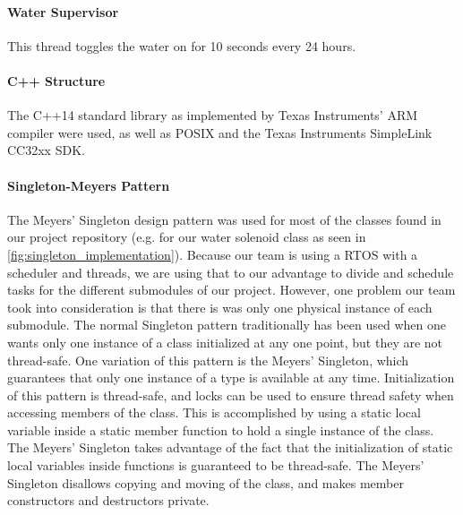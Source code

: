 \paragraph{Water Supervisor} This thread toggles the water on for 10 seconds every 24 hours.

\paragraph{C++ Structure}
The C++14 standard library as implemented by Texas Instruments' ARM compiler were used, as well as POSIX and the Texas Instruments SimpleLink CC32xx SDK.

\paragraph{Singleton-Meyers Pattern}
The Meyers' Singleton design pattern was used for most of the classes found in our project repository (e.g. for our water solenoid class as seen in \ref{fig:singleton_implementation}). Because our team is using a RTOS with a scheduler and threads, we are using that to our advantage to divide and schedule tasks for the different submodules of our project. However, one problem our team took into consideration is that there is was only one physical instance of each submodule. The normal Singleton pattern traditionally has been used when one wants only one instance of a class initialized at any one point, but they are not thread-safe. One variation of this pattern is the Meyers' Singleton, which guarantees that only one instance of a type is available at any time. Initialization of this pattern is thread-safe, and locks can be used to ensure thread safety when accessing members of the class. This is accomplished by using a static local variable inside a static member function to hold a single instance of the class. The Meyers' Singleton takes advantage of the fact that the initialization of static local variables inside functions is guaranteed to be thread-safe. The Meyers' Singleton disallows copying and moving of the class, and makes member constructors and destructors private.

\lstset{style=mystyle}


